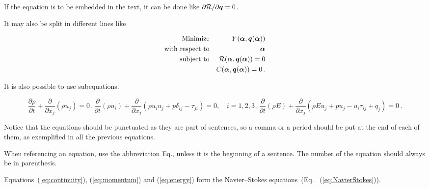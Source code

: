 If the equation is to be embedded in the text, it can be done like ${\partial {\cal R}}/{\partial {\bm q}}=0$.

It may also be split in different lines like

\begin{eqnarray}
  {\rm Minimize}   && Y({\bm \alpha},{\bm q}({\bm \alpha}))            \nonumber           \\
  {\rm with~respect~to}     && {\bm \alpha}                                     \label{eq:minimize} \\
  {\rm subject~to} && {\cal R}({\bm \alpha},{\bm q}({\bm \alpha})) = 0 \nonumber           \\
                   &&       C ({\bm \alpha},{\bm q}({\bm \alpha})) = 0 \,. \nonumber
\end{eqnarray}

It is also possible to use subequations.

\begin{subequations}
    \begin{equation}
    \frac{\partial \rho}{\partial t} + \frac{\partial}{\partial x_j}\left( \rho u_j \right) = 0 \,,
    \label{eq:continuity}
    \end{equation}
    \begin{equation}
    \frac{\partial}{\partial t}\left( \rho u_i \right) + \frac{\partial}{\partial x_j} \left( \rho u_i u_j + p \delta_{ij} - \tau_{ji} \right) = 0, \quad i=1,2,3 \,,
    \label{eq:momentum}
    \end{equation}
    \begin{equation}
        \frac{\partial}{\partial t}\left( \rho E \right) + \frac{\partial}{\partial x_j} \left( \rho E u_j + p u_j - u_i \tau_{ij} + q_j \right) = 0 \,.
    \label{eq:energy}
    \end{equation}
\label{eq:NavierStokes}%
\end{subequations}

Notice that the equations should be punctuated as they are part of sentences, so a comma or a period should be put at the end of each of them, as exemplified in all the previous equations.

When referencing an equation, use the abbreviation Eq., unless it is the beginning of a sentence.
The number of the equation should always be in parenthesis.

Equations~(\ref{eq:continuity}), (\ref{eq:momentum}) and (\ref{eq:energy}) form the Navier--Stokes equations~(Eq.~ (\ref{eq:NavierStokes})).


